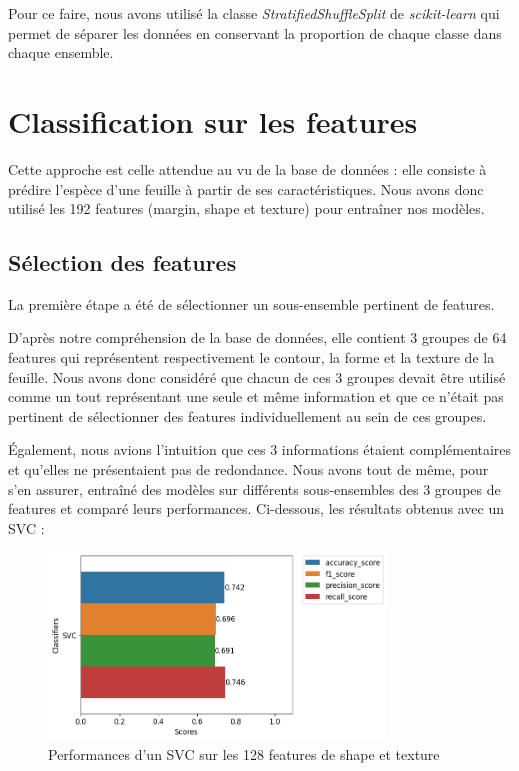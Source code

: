 \documentclass{article}
\begin{document}
Pour ce faire, nous avons utilisé la classe
\textit{StratifiedShuffleSplit} \cite{SSS} de \textit{scikit-learn} qui permet de séparer les données
en conservant la proportion de chaque classe dans chaque ensemble.

\newpage
\section{Classification sur les features}
Cette approche est celle attendue au vu de la base de données : elle consiste à prédire l'espèce
d'une feuille à partir de ses caractéristiques. Nous avons donc utilisé les 192 features
(margin, shape et texture) pour entraîner nos modèles.

\subsection{Sélection des features}
La première étape a été de sélectionner un sous-ensemble pertinent de features. 

D'après notre
compréhension de la base de données, elle contient 3 groupes de 64 features qui représentent
respectivement le contour, la forme et la texture de la feuille. Nous avons donc considéré
que chacun de ces 3 groupes devait être utilisé comme un tout représentant
une seule et même information et que ce n'était pas pertinent
de sélectionner des features individuellement au sein de ces groupes.

Également, nous avions l'intuition que ces 3 informations étaient complémentaires et qu'elles
ne présentaient pas de redondance. Nous avons tout de même, pour s'en assurer, entraîné des
modèles sur différents sous-ensembles des 3 groupes de features et comparé leurs performances. 
Ci-dessous, les résultats obtenus avec un SVC \cite{SVC} :

\begin{figure}[h]
    \centering
    \includegraphics[width=0.8\textwidth]{img/svc_perfs_without_margin.png}
    \caption{Performances d'un SVC sur les 128 features de shape et texture}
\end{figure}
\end{document}
